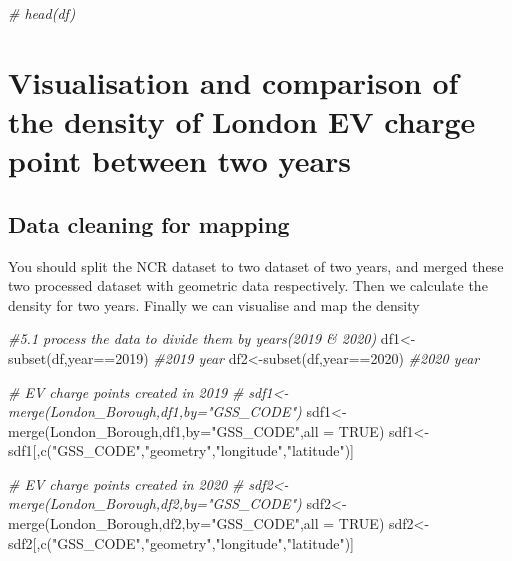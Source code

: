 \documentclass[
]{book}
\newenvironment{Shaded}{\begin{snugshade}}{\end{snugshade}}
\newcommand{\AttributeTok}[1]{\textcolor[rgb]{0.77,0.63,0.00}{#1}}
\newcommand{\CommentTok}[1]{\textcolor[rgb]{0.56,0.35,0.01}{\textit{#1}}}
\newcommand{\ConstantTok}[1]{\textcolor[rgb]{0.00,0.00,0.00}{#1}}
\newcommand{\DecValTok}[1]{\textcolor[rgb]{0.00,0.00,0.81}{#1}}
\newcommand{\FunctionTok}[1]{\textcolor[rgb]{0.00,0.00,0.00}{#1}}
\newcommand{\NormalTok}[1]{#1}
\newcommand{\OtherTok}[1]{\textcolor[rgb]{0.56,0.35,0.01}{#1}}
\newcommand{\SpecialCharTok}[1]{\textcolor[rgb]{0.00,0.00,0.00}{#1}}
\newcommand{\StringTok}[1]{\textcolor[rgb]{0.31,0.60,0.02}{#1}}
\begin{document}
\begin{Shaded}
\begin{Highlighting}[]
\CommentTok{\# head(df)}
\end{Highlighting}
\end{Shaded}

\hypertarget{visualisation-and-comparison-of-the-density-of-london-ev-charge-point-between-two-years}{%
\chapter{Visualisation and comparison of the density of London EV charge point between two years}\label{visualisation-and-comparison-of-the-density-of-london-ev-charge-point-between-two-years}}

\hypertarget{data-cleaning-for-mapping}{%
\section{Data cleaning for mapping}\label{data-cleaning-for-mapping}}

You should split the NCR dataset to two dataset of two years, and merged these two processed dataset with geometric data respectively. Then we calculate the density for two years. Finally we can visualise and map the density

\begin{Shaded}
\begin{Highlighting}[]
\CommentTok{\#5.1 process the data to divide them by years(2019 \& 2020)}
\NormalTok{df1}\OtherTok{\textless{}{-}}\FunctionTok{subset}\NormalTok{(df,year}\SpecialCharTok{==}\DecValTok{2019}\NormalTok{) }\CommentTok{\#2019 year}
\NormalTok{df2}\OtherTok{\textless{}{-}}\FunctionTok{subset}\NormalTok{(df,year}\SpecialCharTok{==}\DecValTok{2020}\NormalTok{) }\CommentTok{\#2020 year}

\CommentTok{\# EV charge points created in 2019}
\CommentTok{\# sdf1\textless{}{-}merge(London\_Borough,df1,by="GSS\_CODE")}
\NormalTok{sdf1}\OtherTok{\textless{}{-}}\FunctionTok{merge}\NormalTok{(London\_Borough,df1,}\AttributeTok{by=}\StringTok{"GSS\_CODE"}\NormalTok{,}\AttributeTok{all =} \ConstantTok{TRUE}\NormalTok{)}
\NormalTok{sdf1}\OtherTok{\textless{}{-}}\NormalTok{sdf1[,}\FunctionTok{c}\NormalTok{(}\StringTok{"GSS\_CODE"}\NormalTok{,}\StringTok{"geometry"}\NormalTok{,}\StringTok{"longitude"}\NormalTok{,}\StringTok{"latitude"}\NormalTok{)]}

\CommentTok{\# EV charge points created in 2020}
\CommentTok{\# sdf2\textless{}{-}merge(London\_Borough,df2,by="GSS\_CODE")}
\NormalTok{sdf2}\OtherTok{\textless{}{-}}\FunctionTok{merge}\NormalTok{(London\_Borough,df2,}\AttributeTok{by=}\StringTok{"GSS\_CODE"}\NormalTok{,}\AttributeTok{all =} \ConstantTok{TRUE}\NormalTok{)}
\NormalTok{sdf2}\OtherTok{\textless{}{-}}\NormalTok{sdf2[,}\FunctionTok{c}\NormalTok{(}\StringTok{"GSS\_CODE"}\NormalTok{,}\StringTok{"geometry"}\NormalTok{,}\StringTok{"longitude"}\NormalTok{,}\StringTok{"latitude"}\NormalTok{)]}
\end{Highlighting}
\end{Shaded}
\end{document}
